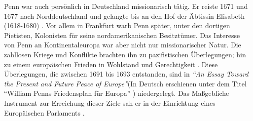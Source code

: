\medskip

Penn war auch persönlich in Deutschland missionarisch tätig. Er reiste 1671 und 1677
nach Norddeutschland  und gelangte bis an den Hof
der Äbtissin Elisabeth (1618-1680) . Vor
allem in Frankfurt  warb Penn später, unter den dortigen
Pietisten,
Kolonisten  für seine nordamerikanischen
 Besitztümer. Das Interesse von Penn an Kontinentaleuropa war
aber nicht nur missionarischer Natur. Die zahllosen Kriege und Konflikte brachten
ihn zu pazifistischen 
Überlegungen; hin zu einem europäischen Frieden  in
Wohlstand  und Gerechtigkeit . Diese Überlegungen, die
zwischen 1691 bis 1693 entstanden, sind in \textit{"`An Essay Toward the Present and Future
Peace of Europe"'}(In Deutsch erschienen unter dem Titel "`William Penns
Friedensplan für Europa"' ) niedergelegt. Das Maßgebliche Instrument zur
Erreichung dieser Ziele sah er in der Einrichtung eines Europäischen Parlaments
.

